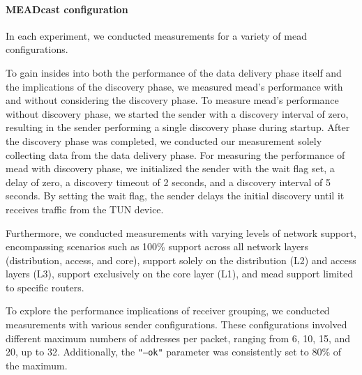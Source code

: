 \paragraph{MEADcast configuration} %
\label{par:MEADcast configuration}
In each experiment, we conducted measurements for a variety of \gls{mead}
    configurations.

To gain insides into both the performance of the data delivery phase itself and
    the implications of the discovery phase, we measured \gls{mead}'s performance
    with and without considering the discovery phase.
To measure \gls{mead}'s performance without discovery phase, we started the
    sender with a discovery interval of zero, resulting in the sender
    performing a single discovery phase during startup.
After the discovery phase was completed, we conducted our measurement solely
    collecting data from the data delivery phase.
For measuring the performance of \gls{mead} with discovery phase, we initialized
    the sender with the wait flag set, a delay of zero, a discovery timeout of
    2 seconds, and a discovery interval of 5 seconds.
By setting the wait flag, the sender delays the initial discovery until it
    receives traffic from the TUN device.

Furthermore, we conducted measurements with varying levels of network support,
    encompassing scenarios such as 100\% support across all network layers
    (distribution, access, and core), support solely on the distribution (L2)
    and access layers (L3), support exclusively on the core layer (L1), and
    \gls{mead} support limited to specific routers.

To explore the performance implications of receiver grouping, we conducted
    measurements with various sender configurations.
These configurations involved different maximum numbers of addresses per
    packet, ranging from 6, 10, 15, and 20, up to 32.
Additionally, the \texttt{"--ok"} parameter was consistently set to 80\% of the
    maximum.


